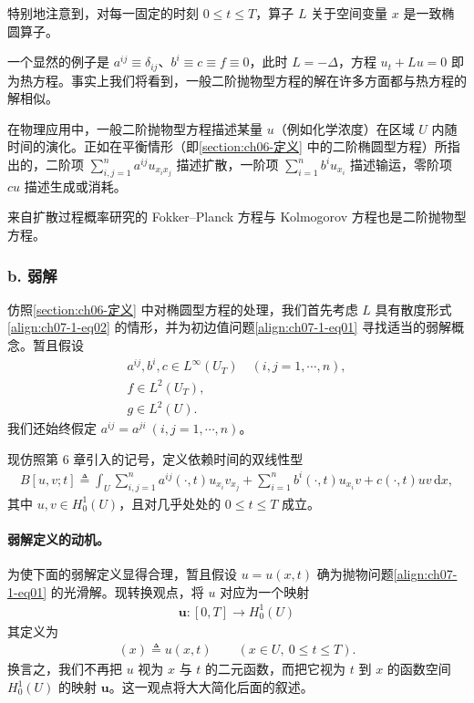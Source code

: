 \documentclass[../../main.tex]{subfiles}
\begin{document}
\begin{remark}\label{remark:ch07-1-抛物即空间椭圆}
特别地注意到，对每一固定的时刻 $0\leqslant t\leqslant T$，算子 $L$ 关于空间变量 $x$ 是一致椭圆算子。
\end{remark}

一个显然的例子是 $a^{ij}\equiv\delta_{ij}$、$b^i\equiv c\equiv f\equiv 0$，此时 $L=-\Delta$，方程 $u_t+Lu=0$ 即为热方程。事实上我们将看到，一般二阶抛物型方程的解在许多方面都与热方程的解相似。

在物理应用中，一般二阶抛物型方程描述某量 $u$（例如化学浓度）在区域 $U$ 内随时间的演化。正如在平衡情形（即\cref{section:ch06-定义} 中的二阶椭圆型方程）所指出的，二阶项 $\sum_{i,j=1}^n a^{ij}u_{x_ix_j}$ 描述扩散，一阶项 $\sum_{i=1}^n b^i u_{x_i}$ 描述输运，零阶项 $cu$ 描述生成或消耗。

来自扩散过程概率研究的 Fokker--Planck 方程与 Kolmogorov 方程也是二阶抛物型方程。

\subsubsection*{b. 弱解}

仿照\cref{section:ch06-定义} 中对椭圆型方程的处理，我们首先考虑 $L$ 具有散度形式\eqref{align:ch07-1-eq02} 的情形，并为初边值问题\eqref{align:ch07-1-eq01} 寻找适当的弱解概念。暂且假设
\begin{align}
a^{ij},b^i,c\in L^\infty(U_T)\quad (i,j=1,\cdots,n),\label{align:ch07-1-eq05}\\
f\in L^2(U_T),\label{align:ch07-1-eq06}\\
g\in L^2(U).\label{align:ch07-1-eq07}
\end{align}
我们还始终假定 $a^{ij}=a^{ji}\ (i,j=1,\cdots,n)$。

现仿照第 6 章引入的记号，定义依赖时间的双线性型
\begin{align}
B[u,v;t]\triangleq \int_U \sum_{i,j=1}^n a^{ij}(\cdot,t)u_{x_i}v_{x_j} + \sum_{i=1}^n b^i(\cdot,t)u_{x_i}v + c(\cdot,t)uv\,\mathrm{d}x,\label{align:ch07-1-eq08}
\end{align}
其中 $u,v\in H^1_0(U)$，且对几乎处处的 $0\leqslant t\leqslant T$ 成立。

\paragraph{弱解定义的动机。}为使下面的弱解定义显得合理，暂且假设 $u=u(x,t)$ 确为抛物问题\eqref{align:ch07-1-eq01} 的光滑解。现转换观点，将 $u$ 对应为一个映射
\begin{align*}
\mathbf{u}:[0,T]\to H^1_0(U)
\end{align*}
其定义为
\begin{align*}
[\mathbf{u}(t)](x)\triangleq u(x,t)\qquad (x\in U,\ 0\leqslant t\leqslant T).
\end{align*}
换言之，我们不再把 $u$ 视为 $x$ 与 $t$ 的二元函数，而把它视为 $t$ 到 $x$ 的函数空间 $H^1_0(U)$ 的映射 $\mathbf{u}$。这一观点将大大简化后面的叙述。
\end{document}
